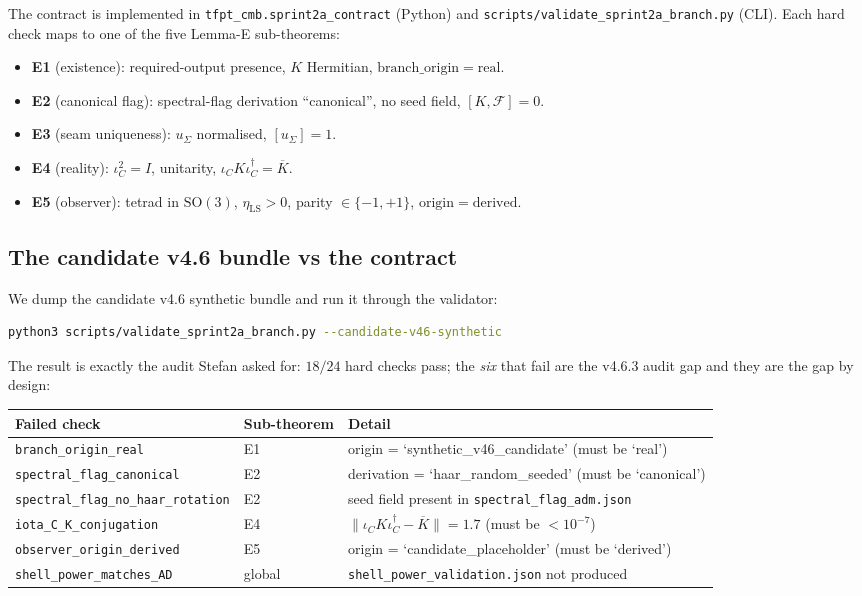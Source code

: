 \documentclass[11pt,a4paper]{article}
\begin{document}
The contract is implemented in
\texttt{tfpt\_cmb.sprint2a\_contract} (Python) and
\texttt{scripts/validate\_sprint2a\_branch.py} (CLI).  Each hard check
maps to one of the five Lemma-E sub-theorems:
\begin{itemize}[leftmargin=1.4em]
\item \textbf{E1} (existence): required-output presence,
\(K\) Hermitian, \(\mathrm{branch\_origin}=\mathrm{real}\).
\item \textbf{E2} (canonical flag): spectral-flag derivation
``canonical'', no seed field, \([K, \mathcal F]=0\).
\item \textbf{E3} (seam uniqueness): \(u_\Sigma\) normalised,
\([u_\Sigma]=1\).
\item \textbf{E4} (reality): \(\iota_C^2=I\), unitarity,
\(\iota_C K \iota_C^\dagger=\overline{K}\).
\item \textbf{E5} (observer): tetrad in \(\mathrm{SO}(3)\),
\(\eta_{\mathrm{LS}}>0\), parity \(\in\{-1,+1\}\),
\(\mathrm{origin}=\mathrm{derived}\).
\end{itemize}

\subsection{The candidate v4.6 bundle vs the contract}

We dump the candidate v4.6 synthetic bundle and run it through the
validator:
\begin{lstlisting}[language=bash]
python3 scripts/validate_sprint2a_branch.py --candidate-v46-synthetic
\end{lstlisting}
The result is exactly the audit Stefan asked for: \(18/24\) hard
checks pass; the \emph{six} that fail are the v4.6.3 audit gap and
they are the gap by design:

\begin{center}
\renewcommand{\arraystretch}{1.13}
\begin{tabularx}{\textwidth}{@{}lp{}Y@{}}
\toprule
\textbf{Failed check} & \textbf{Sub-theorem} & \textbf{Detail} \\
\midrule
\texttt{branch\_origin\_real} & E1 & origin = `synthetic\_v46\_candidate' (must be `real') \\
\texttt{spectral\_flag\_canonical} & E2 & derivation = `haar\_random\_seeded' (must be `canonical') \\
\texttt{spectral\_flag\_no\_haar\_rotation} & E2 & seed field present in \texttt{spectral\_flag\_adm.json} \\
\texttt{iota\_C\_K\_conjugation} & E4 & \(\|\iota_C K \iota_C^\dagger - \overline{K}\|=1.7\) (must be \(<10^{-7}\)) \\
\texttt{observer\_origin\_derived} & E5 & origin = `candidate\_placeholder' (must be `derived') \\
\texttt{shell\_power\_matches\_AD} & global & \texttt{shell\_power\_validation.json} not produced \\
\bottomrule
\end{tabularx}
\end{center}
\end{document}

